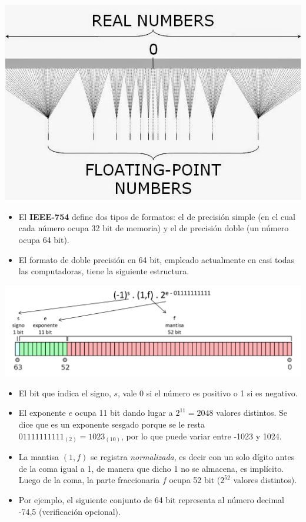 \documentclass[openany]{book}
\providecommand{\tightlist}{%
  \setlength{\itemsep}{0pt}\setlength{\parskip}{0pt}}
\begin{document}
\begin{center}\includegraphics[width=0.5\linewidth]{Plots/U1/floatingPoint} \end{center}

\begin{itemize}
\tightlist
\item
  El \textbf{IEEE-754} define dos tipos de formatos: el de precisión simple (en el cual cada número ocupa 32 bit de memoria) y el de precisión doble (un número ocupa 64 bit).
\item
  El formato de doble precisión en 64 bit, empleado actualmente en casi todas las computadoras, tiene la siguiente estructura.
\end{itemize}

\begin{center}\includegraphics[width=0.9\linewidth]{Plots/U1/float64_2} \end{center}

\begin{itemize}
\item
  El bit que indica el signo, \(s\), vale 0 si el número es positivo o 1 si es negativo.
\item
  El exponente \(e\) ocupa 11 bit dando lugar a \(2^{11} = 2048\) valores distintos. Se dice que es un exponente sesgado porque se le resta \(01111111111_{(2)} = 1023_{(10)}\), por lo que puede variar entre -1023 y 1024.
\item
  La mantisa \((1,f)\) se registra \emph{normalizada}, es decir con un solo dígito antes de la coma igual a 1, de manera que dicho 1 no se almacena, es implícito. Luego de la coma, la parte fraccionaria \(f\) ocupa 52 bit (\(2^{52}\) valores distintos).
\item
  Por ejemplo, el siguiente conjunto de 64 bit representa al número decimal -74,5 (verificación opcional).
\end{itemize}
\end{document}
